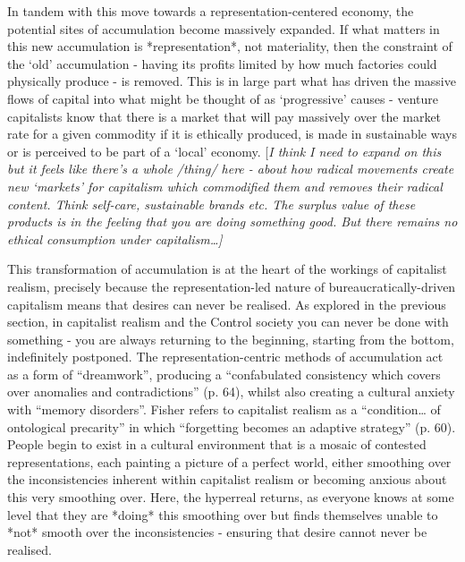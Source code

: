 In tandem with this move towards a representation-centered economy, the
potential sites of accumulation become massively expanded. If what
matters in this new accumulation is *representation*, not materiality,
then the constraint of the `old' accumulation - having its profits
limited by how much factories could physically produce - is removed.
This is in large part what has driven the massive flows of capital into
what might be thought of as `progressive' causes - venture capitalists
know that there is a market that will pay massively over the market rate
for a given commodity if it is ethically produced, is made in
sustainable ways or is perceived to be part of a `local' economy.
{[}\emph{\emph{I think I need to expand on this but it feels like
there's a whole /thing/ here - about how radical movements create new
`markets' for capitalism which commodified them and removes their
radical content. Think self-care, sustainable brands etc. The surplus
value of these products is in the feeling that you are doing something
good. But there remains no ethical consumption under
capitalism\ldots{}{]}}}

This transformation of accumulation is at the heart of the workings of
capitalist realism, precisely because the representation-led nature of
bureaucratically-driven capitalism means that desires can never be
realised. As explored in the previous section, in capitalist realism and
the Control society you can never be done with something - you are
always returning to the beginning, starting from the bottom,
indefinitely postponed. The representation-centric methods of
accumulation act as a form of ``dreamwork'', producing a ``confabulated
consistency which covers over anomalies and contradictions'' (p. 64),
whilst also creating a cultural anxiety with ``memory disorders''.
Fisher refers to capitalist realism as a ``condition\ldots{} of
ontological precarity'' in which ``forgetting becomes an adaptive
strategy'' (p. 60). People begin to exist in a cultural environment that
is a mosaic of contested representations, each painting a picture of a
perfect world, either smoothing over the inconsistencies inherent within
capitalist realism or becoming anxious about this very smoothing over.
Here, the hyperreal returns, as everyone knows at some level that they
are *doing* this smoothing over but finds themselves unable to *not*
smooth over the inconsistencies - ensuring that desire cannot never be
realised.

